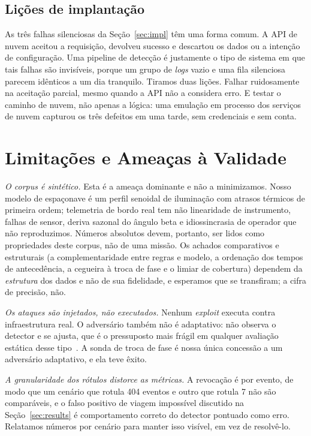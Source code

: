 \documentclass[conference]{IEEEtran}
\begin{document}
\subsection{Lições de implantação}

As três falhas silenciosas da Seção~\ref{sec:impl} têm uma forma comum. A API de
nuvem aceitou a requisição, devolveu sucesso e descartou os dados ou a intenção
de configuração. Uma pipeline de detecção é justamente o tipo de sistema em que
tais falhas são invisíveis, porque um grupo de \emph{logs} vazio e uma fila
silenciosa parecem idênticos a um dia tranquilo. Tiramos duas lições. Falhar ruidosamente
na aceitação parcial, mesmo quando a API não a considera erro. E testar o
caminho de nuvem, não apenas a lógica: uma emulação em processo dos serviços de
nuvem capturou os três defeitos em uma tarde, sem credenciais e sem conta.

\section{Limitações e Ameaças à Validade}
\label{sec:limitations}

\emph{O corpus é sintético.} Esta é a ameaça dominante e não a minimizamos.
Nosso modelo de espaçonave é um perfil senoidal de iluminação com atrasos
térmicos de primeira ordem; telemetria de bordo real tem não linearidade de
instrumento, falhas de sensor, deriva sazonal do ângulo beta e idiossincrasia de
operador que não reproduzimos. Números absolutos devem, portanto, ser lidos como
propriedades deste corpus, não de uma missão. Os achados comparativos e
estruturais (a complementaridade entre regras e modelo, a ordenação dos tempos
de antecedência, a cegueira à troca de fase e o limiar de cobertura) dependem
da \emph{estrutura} dos dados e não de sua fidelidade, e esperamos que
se transfiram; a cifra de precisão, não.

\emph{Os ataques são injetados, não executados.} Nenhum \emph{exploit} executa
contra infraestrutura real. O adversário também não é adaptativo: não observa o
detector e se ajusta, que é o pressuposto mais frágil em qualquer avaliação
estática desse tipo~\cite{sommer2010closedworld}. A sonda de troca de fase é
nossa única concessão a um adversário adaptativo, e ela teve êxito.

\emph{A granularidade dos rótulos distorce as métricas.} A revocação é por
evento, de modo que um cenário que rotula 404 eventos e outro que rotula 7 não
são comparáveis, e o falso positivo de viagem impossível discutido na
Seção~\ref{sec:results} é comportamento correto do detector pontuado como erro.
Relatamos números por cenário para manter isso visível, em vez de resolvê-lo.
\end{document}
